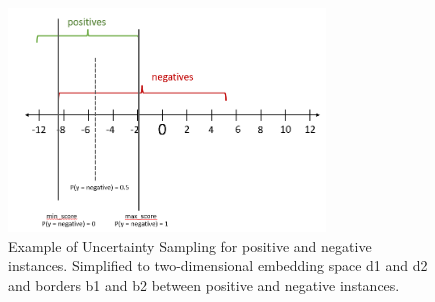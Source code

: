 \begin{figure}[t]
  \centering
    \includegraphics[width=0.75\textwidth]{figures/positives_negatives2.PNG}
  \caption{Example of Uncertainty Sampling for positive and negative instances. Simplified to two-dimensional embedding space d1 and d2 and borders b1 and b2 between positive and negative instances.}
  \label{fig:informativeinstances}
\end{figure}